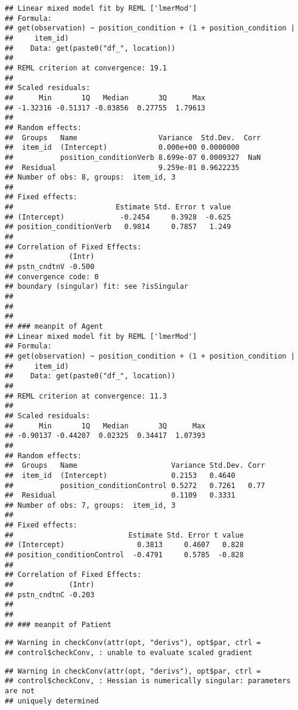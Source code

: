 \documentclass[]{article}
\begin{document}
\begin{verbatim}
## Linear mixed model fit by REML ['lmerMod']
## Formula: 
## get(observation) ~ position_condition + (1 + position_condition |  
##     item_id)
##    Data: get(paste0("df_", location))
## 
## REML criterion at convergence: 19.1
## 
## Scaled residuals: 
##      Min       1Q   Median       3Q      Max 
## -1.32316 -0.51317 -0.03856  0.27755  1.79613 
## 
## Random effects:
##  Groups   Name                   Variance  Std.Dev.  Corr
##  item_id  (Intercept)            0.000e+00 0.0000000     
##           position_conditionVerb 8.699e-07 0.0009327  NaN
##  Residual                        9.259e-01 0.9622235     
## Number of obs: 8, groups:  item_id, 3
## 
## Fixed effects:
##                        Estimate Std. Error t value
## (Intercept)             -0.2454     0.3928  -0.625
## position_conditionVerb   0.9814     0.7857   1.249
## 
## Correlation of Fixed Effects:
##             (Intr)
## pstn_cndtnV -0.500
## convergence code: 0
## boundary (singular) fit: see ?isSingular
## 
##   
##   
## ### meanpit of Agent   
## Linear mixed model fit by REML ['lmerMod']
## Formula: 
## get(observation) ~ position_condition + (1 + position_condition |  
##     item_id)
##    Data: get(paste0("df_", location))
## 
## REML criterion at convergence: 11.3
## 
## Scaled residuals: 
##      Min       1Q   Median       3Q      Max 
## -0.90137 -0.44207  0.02325  0.34417  1.07393 
## 
## Random effects:
##  Groups   Name                      Variance Std.Dev. Corr
##  item_id  (Intercept)               0.2153   0.4640       
##           position_conditionControl 0.5272   0.7261   0.77
##  Residual                           0.1109   0.3331       
## Number of obs: 7, groups:  item_id, 3
## 
## Fixed effects:
##                           Estimate Std. Error t value
## (Intercept)                 0.3813     0.4607   0.828
## position_conditionControl  -0.4791     0.5785  -0.828
## 
## Correlation of Fixed Effects:
##             (Intr)
## pstn_cndtnC -0.203
##   
##   
## ### meanpit of Patient
\end{verbatim}

\begin{verbatim}
## Warning in checkConv(attr(opt, "derivs"), opt$par, ctrl =
## control$checkConv, : unable to evaluate scaled gradient
\end{verbatim}

\begin{verbatim}
## Warning in checkConv(attr(opt, "derivs"), opt$par, ctrl =
## control$checkConv, : Hessian is numerically singular: parameters are not
## uniquely determined
\end{verbatim}
\end{document}
